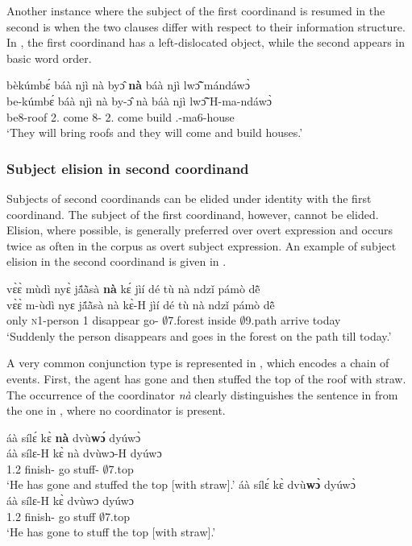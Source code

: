 Another instance where the subject of the first coordinand is resumed in the second is when the two clauses differ with respect to their information structure. In , the first coordinand has a left-dislocated object, while the second appears in basic word order.


\ea\label{Coord5} 
  \glll   bèkúmbɛ́ báà njì nà byɔ̂ {\bfseries nà} báà njì lwɔ̃̂ mándáwɔ̀\\
          be-kúmbɛ́ báà njì nà by-ɔ̂ nà báà njì lwɔ̃̂ H-ma-ndáwɔ̀\\
           be8-roof  2.{\FUT} come {\COM} 8-{\OBJ} {\CONJ} 2.{\FUT} come build {\OBJ}.{\LINK}-ma6-house\\
    \trans `They will bring roofs and they will come and build houses.'
\z

\subsubsection*{Subject elision in second coordinand}
Subjects of second coordinands can be elided under identity with the first coordinand. The subject of the first coordinand, however, cannot be elided. Elision, where possible, is generally preferred over overt expression and occurs twice as often in the corpus as overt subject expression. An example of subject elision in the second coordinand is given in .


\ea\label{Coord6}
  \glll   vɛ̀ɛ̀ mùdì nyɛ̀ jã́ã̀sà {\bfseries nà} kɛ́ jìí dé tù nà ndzǐ pámò dẽ̂\\
           vɛ̀ɛ̀ m-ùdì nyɛ jã́ã̀sà nà kɛ̀-H jìí dé tù nà ndzǐ pámò dẽ̂ \\
           only \textsc{n}1-person 1 disappear {\CONJ} go-{\R} $\emptyset$7.forest {\LOC} inside {\COM} $\emptyset$9.path arrive today \\
    \trans `Suddenly the person disappears and goes in the forest on the path till today.'
\z

A very common conjunction type is represented in , which encodes a chain of events. First, the agent has gone and then stuffed the top of the roof with straw. The occurrence of the coordinator {\itshape nà} clearly distinguishes the sentence in  from the one in , where no coordinator is present.


\ea\label{Coord7}
\ea\label{Coord7a}
  \glll áà sílɛ́ kɛ̀ {\bfseries nà} dvù{\bfseries wɔ́} dyúwɔ̀ \\
     áà sílɛ-H kɛ̀ nà dvùwɔ-H dyúwɔ \\
        1.{\PST}2 finish-{\R} go {\CONJ} stuff-{\R} $\emptyset$7.top \\
    \trans `He has gone and stuffed the top [with straw].'
\ex\label{Coord7b}
  \glll áà sílɛ́ kɛ̀ dvù{\bfseries wɔ̀} dyúwɔ̀ \\
     áà sílɛ-H kɛ̀ dvùwɔ dyúwɔ \\
        1.{\PST}2 finish-{\R} go stuff $\emptyset$7.top \\
    \trans `He has gone to stuff the top [with straw].'
\z
\z

